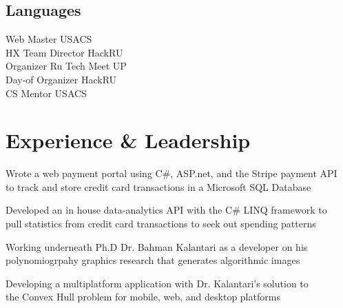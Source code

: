 \documentclass[]{deedy-resume-openfont}
\begin{document}
\begin{minipage}[t]{0.33\textwidth}
\subsection{Languages}
Web Master \textbullet{} USACS \\ 
HX Team Director \textbullet{} HackRU \\
Organizer \textbullet{} Ru Tech Meet UP \\ 
Day-of Organizer \textbullet{} HackRU \\
CS Mentor \textbullet{} USACS \\ 
\sectionsep


%
%

\end{minipage} 
\hfill
\begin{minipage}[t]{0.66\textwidth} 


\section{Experience \& Leadership}

\vspace{\topsep} 
\begin{tightemize}
\item Wrote a web payment portal using C\#, ASP.net, and the Stripe payment API \\to track and store credit card transactions in a Microsoft SQL Database
\item Developed an in house data-analytics API with the C\# LINQ framework to \\pull statistics from credit card transactions to seek out spending patterns
\end{tightemize}
\sectionsep

\begin{tightemize}
\item Working underneath Ph.D Dr. Bahman Kalantari as a developer on his polynomiogrpahy graphics research that generates algorithmic images  
\item Developing a multiplatform application with Dr. Kalantari's solution to \\the Convex Hull problem for mobile, web, and desktop platforms
\end{tightemize}
\sectionsep


\end{minipage}
\end{document}
